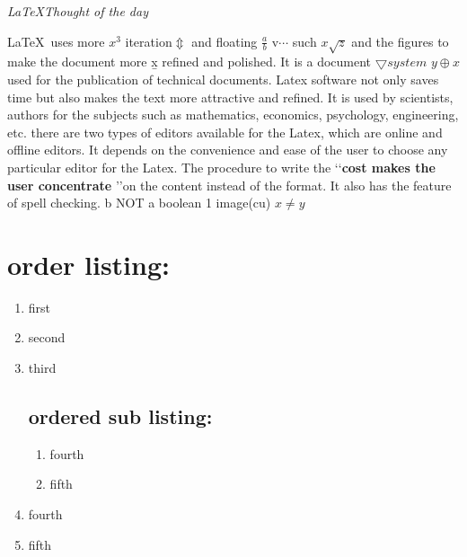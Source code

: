 \documentclass[a4paper]{article}
\begin{document}
\begin{center}
\begin{large}
\begin{huge}

\textit{ \LaTeX Thought of the day} \\
\end{huge}

\end{large}
\end{center}

\LaTeX\ uses more $x^{3}$
iteration$ \Updownarrow $
and floating $ \frac{a}{b} $ v$\cdots$
such
$ x\sqrt{z} $ and the figures to make the document more \b x refined and polished.%
It is a document $\bigtriangledown system   $  $ y\oplus x$used for the publication of technical documents. Latex software not only saves time but also makes the text more attractive and refined. It is used by scientists, authors for the subjects such as mathematics, economics, psychology, engineering, etc. there are two types of editors available for the Latex, which are online and offline editors. It depends on the convenience and ease of the user to choose any particular editor for the Latex. The procedure to write the \lq \lq \textbf{cost makes the user concentrate} \rq \rq on the content instead of the format. It also has the feature of spell checking. 
b NOT a
boolean  1 image(cu)
$x \neq y$

\section{order listing: }

\begin{enumerate}
\item first
\item second 
\item third
\subsection{ordered sub listing: }
        \begin{enumerate}
          \item fourth 
          \item fifth 
         \end{enumerate}
\item fourth 
\item fifth 
\end{enumerate}
\end{document}
